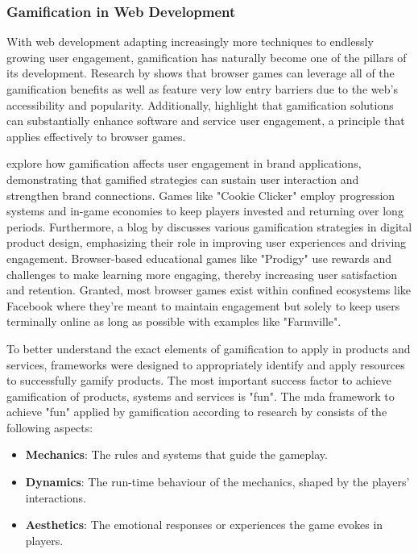 \subsubsection{Gamification in Web Development}

With web development adapting increasingly more techniques to endlessly growing user engagement, gamification has naturally become one of the pillars of its development. 
Research by \textcite{roleOfMobile} shows that browser games can leverage all of the gamification benefits as well as feature very low entry barriers due to the web's accessibility and popularity. 
Additionally, \textcite{doesItWork} highlight that gamification solutions can substantially enhance software and service user engagement, a principle that applies effectively to browser games.

\textcite{sustainability} explore how gamification affects user engagement in brand applications, demonstrating that gamified strategies can sustain user interaction and strengthen brand connections. 
Games like "Cookie Clicker" employ progression systems and in-game economies to keep players invested and returning over long periods. 
Furthermore, a blog by \textcite{UXdesign} discusses various gamification strategies in digital product design, emphasizing their role in improving user experiences and driving engagement. 
Browser-based educational games like "Prodigy" use rewards and challenges to make learning more engaging, thereby increasing user satisfaction and retention.
Granted, most browser games exist within confined ecosystems like Facebook where they're meant to maintain engagement but solely to keep users terminally online as long as possible with examples like "Farmville".

To better understand the exact elements of gamification to apply in products and services, frameworks were designed to appropriately identify and apply resources to successfully gamify products. 
The most important success factor to achieve gamification of products, systems and services is "fun". 
The \acrshort{mda} framework to achieve "fun" applied by gamification according to research by \textcite{sustainability} consists of the following aspects:

\begin{itemize}
    \item \textbf{Mechanics}:  The rules and systems that guide the gameplay.
    \item \textbf{Dynamics}:  The run-time behaviour of the mechanics, shaped by the players' interactions.
    \item \textbf{Aesthetics}:  The emotional responses or experiences the game evokes in players.
\end{itemize}

